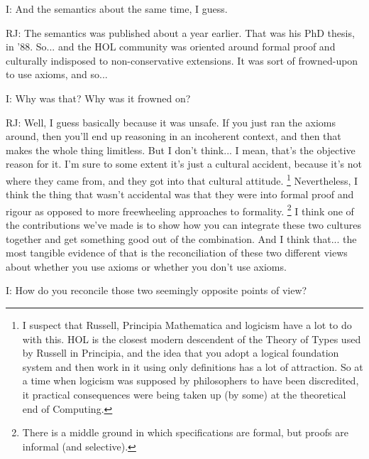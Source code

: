 \documentclass[10pt,titlepage]{book}
\begin{document}
I: And the semantics about the same time, I guess.

RJ: The semantics was published about a year earlier.
That was his PhD thesis, in '88.
So... and the HOL community was oriented around formal proof and culturally indisposed to non-conservative extensions.
It was sort of frowned-upon to use axioms, and so...

I: Why was that? Why was it frowned on?

RJ: Well, I guess basically because it was unsafe.
If you just ran the axioms around, then you'll end up reasoning in an incoherent context, and then that makes the whole thing limitless.
But I don't think... I mean, that's the objective reason for it.
I'm sure to some extent it's just a cultural accident, because it's not where they came from, and they got into that cultural attitude.%
\footnote{
I suspect that Russell, Principia Mathematica and logicism have a lot to do with this.
HOL is the closest modern descendent of the Theory of Types used by Russell in Principia, and the idea that you adopt a logical foundation system and then work in it using only definitions has a lot of attraction.
So at a time when logicism was supposed by philosophers to have been discredited, it practical consequences were being taken up (by some) at the theoretical end of Computing.}%
Nevertheless, I think the thing that wasn't accidental was that they were into formal proof and rigour as opposed to more freewheeling approaches to formality.%
\footnote{
There is a middle ground in which specifications are formal, but proofs are informal (and selective).
}%
I think one of the contributions we've made is to show how you can integrate these two cultures together and get something good out of the combination.
And I think that... the most tangible evidence of that is the reconciliation of these two different views about whether you use axioms or whether you don't use axioms.

I: How do you reconcile those two seemingly opposite points of view?
\end{document}
